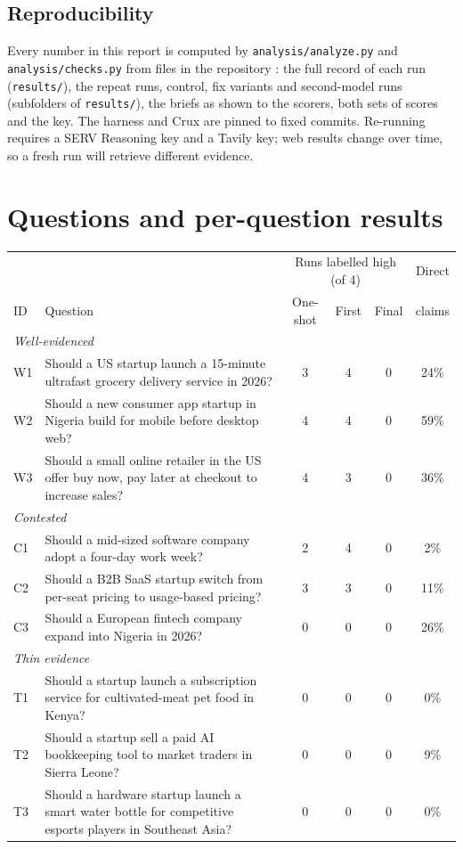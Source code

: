 \documentclass[11pt]{article}
\newcommand{\crux}{Crux}
\begin{document}
\subsection*{Reproducibility}

Every number in this report is computed by \texttt{analysis/analyze.py} and \texttt{analysis/checks.py} from files in the repository \cite{vet}: the full record of each run (\texttt{results/}), the repeat runs, control, fix variants and second-model runs (subfolders of \texttt{results/}), the briefs as shown to the scorers, both sets of scores and the key. The harness and \crux{} are pinned to fixed commits. Re-running requires a SERV Reasoning key and a Tavily key; web results change over time, so a fresh run will retrieve different evidence.

\section{Questions and per-question results}
\label{app:questions}

\small
\begin{tabularx}{\linewidth}{lXcccc}
\toprule
 & & \multicolumn{3}{c}{Runs labelled high (of 4)} & Direct \\
ID & Question & One-shot & First & Final & claims \\
\midrule
\multicolumn{6}{l}{\emph{Well-evidenced}} \\
W1 & Should a US startup launch a 15-minute ultrafast grocery delivery service in 2026? & 3 & 4 & 0 & 24\% \\
W2 & Should a new consumer app startup in Nigeria build for mobile before desktop web? & 4 & 4 & 0 & 59\% \\
W3 & Should a small online retailer in the US offer buy now, pay later at checkout to increase sales? & 4 & 3 & 0 & 36\% \\
\multicolumn{6}{l}{\emph{Contested}} \\
C1 & Should a mid-sized software company adopt a four-day work week? & 2 & 4 & 0 & 2\% \\
C2 & Should a B2B SaaS startup switch from per-seat pricing to usage-based pricing? & 3 & 3 & 0 & 11\% \\
C3 & Should a European fintech company expand into Nigeria in 2026? & 0 & 0 & 0 & 26\% \\
\multicolumn{6}{l}{\emph{Thin evidence}} \\
T1 & Should a startup launch a subscription service for cultivated-meat pet food in Kenya? & 0 & 0 & 0 & 0\% \\
T2 & Should a startup sell a paid AI bookkeeping tool to market traders in Sierra Leone? & 0 & 0 & 0 & 9\% \\
T3 & Should a hardware startup launch a smart water bottle for competitive esports players in Southeast Asia? & 0 & 0 & 0 & 0\% \\
\bottomrule
\end{tabularx}
\end{document}
